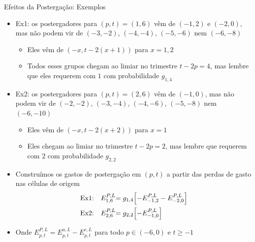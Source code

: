 \begin{frame}{Efeitos da Postergação: Exemplos}
    \begin{itemize}
        \item Ex1: os postergadores para $(p,t)=(1,6)$ vêm de $(-1,2)$ e $(-2,0)$, mas não podem vir de $(-3,-2)$, $(-4,-4)$, $(-5,-6)$ nem $(-6,-8)$
        \begin{itemize}
            \item Eles vêm de $(-x,t-2(x+1))$ para $x=1,2$
            \item {Todos esses grupos chegam ao limiar no trimestre $t-2p=4$, mas lembre que eles requerem com $1$ com probabilidade $g_{1,4}$}
        \end{itemize}
        
        \item Ex2: os postergadores para $(p,t)=(2,6)$ vêm de $(-1,0)$, mas não podem vir de $(-2,-2)$, $(-3,-4)$, $(-4,-6)$, $(-5,-8)$ nem $(-6,-10)$
        \begin{itemize}
            \item Eles vêm de $(-x,t-2(x+2))$ para $x=1$
            \item {Eles chegam ao limiar no trimestre $t-2p=2$, mas lembre que requerem com $2$ com probabilidade $g_{2,2}$}
        \end{itemize}
        
        \item {Construímos os gastos de postergação em $(p,t)$ a partir das perdas de gasto nas células de origem}
        \begin{align*}
        \text{Ex1:}\quad 
        {E^{P,L}_{1,6}}
        &{= g_{1,4}\Bigl[-E^{P,L}_{-1,2}-E^{P,L}_{-2,0}\Bigr]}
        \\
        \text{Ex2:}\quad 
        {E^{P,L}_{2,6}}
        &{= g_{2,2}\Bigl[-E^{P,L}_{-1,0}\Bigr]}
        \end{align*}
        \item {Onde $E^{P,L}_{p,t}=E^{a,L}_{p,t}-E^{c,L}_{p,t}$ para todo $p\in (-6,0)$ e $t\geq -1$}
    \end{itemize}
\end{frame}


